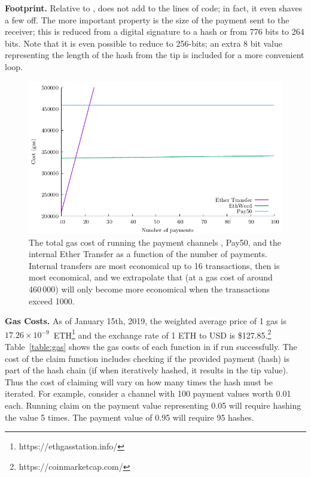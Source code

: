\textbf{Footprint.} Relative to \fifty, \ew does not add to the lines of code; in fact, it even shaves a few off. The more important property is the size of the payment sent to the receiver; this is reduced from a digital signature to a hash or from 776 bits to 264 bits. Note that it is even possible to reduce \eww to 256-bits; an extra 8 bit value representing the length of the hash from the tip is included for a more convenient loop.

\begin{figure}[t]
\centering

\includegraphics[width=0.75\linewidth]{figures/gas.pdf}
\setlength{\belowcaptionskip}{-10pt}
\caption{The total gas cost of running the payment channels \ew, \textsf{Pay50}, and the internal Ether Transfer as a function of the number of payments. Internal transfers are most economical up to 16 transactions, then \ew is most economical, and we extrapolate that \fifty (at a gas cost of around 460\,000) will only become more economical when the transactions exceed 1000.\label{fig:gas}}
	
\end{figure}

\textbf{Gas Costs.} As of January 15th, 2019, the weighted average price of 1 gas is $17.26\times10^{-9}$~ETH\footnote{https://ethgasstation.info/} and the exchange rate of 1 ETH to USD is \$127.85.\footnote{https://coinmarketcap.com/} Table~\ref{table:gas} shows the gas costs of each function in \ew if run successfully. The cost of the claim function includes checking if the provided payment (hash) is part of the hash chain (if when iteratively hashed, it results in the tip value). Thus the cost of claiming will vary on how many times the hash must be iterated. For example, consider a channel with 100 payment values worth 0.01 \eth each. Running claim on the payment value representing 0.05 \eth will require hashing the value 5 times. The payment value of 0.95 \eth will require 95 hashes. 

